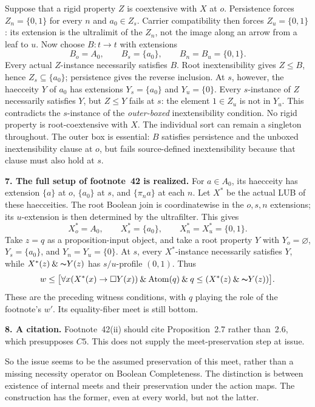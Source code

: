 \documentclass[12pt,leqno]{article}
\newcommand{\AND}{\ensuremath{\mathbin{\&}}}
\newcommand{\IC}{\ensuremath{\rightarrow}}
\newcommand{\NOT}{\ensuremath{\text{$\thicksim$}}}
\newcommand{\two}{\{0,1\}}
\newcommand{\Atom}{\operatorname{Atom}}
\begin{document}
Suppose that a rigid property $Z$ is coextensive with $X$ at $o$.
Persistence forces $Z_n=\two$ for every $n$ and $a_0\in Z_s$.
Carrier compatibility then forces $Z_u=\two$: its extension is the
ultralimit of the $Z_n$, not the image along an arrow from a leaf to $u$.
Now choose $B:t\to t$ with extensions
\[
 B_o=A_0,\qquad B_s=\{a_0\},\qquad B_n=B_u=\two.
\]
Every actual $Z$-instance necessarily satisfies $B$. Root
inextensibility gives $Z\leq B$, hence $Z_s\subseteq\{a_0\}$;
persistence gives the reverse inclusion.
At $s$, however, the haecceity $Y$ of $a_0$ has extensions
$Y_s=\{a_0\}$ and $Y_u=\{0\}$.
Every $s$-instance of $Z$ necessarily satisfies $Y$, but $Z\leq Y$
fails at $s$: the element $1\in Z_u$ is not in $Y_u$.
This contradicts the $s$-instance of the \emph{outer-boxed}
inextensibility condition. No rigid property is root-coextensive with
$X$. The individual sort can remain a singleton throughout.
The outer box is essential: $B$ satisfies persistence and the unboxed
inextensibility clause at $o$, but fails source-defined inextensibility
because that clause must also hold at $s$.

\medskip
\noindent\textbf{7. The full setup of footnote~42 is realized.}
For $a\in A_0$, its haecceity has extension $\{a\}$ at $o$,
$\{a_0\}$ at $s$, and $\{\pi_n a\}$ at each $n$.
Let $X^*$ be the actual LUB of these haecceities.
The root Boolean join is coordinatewise in the $o,s,n$ extensions;
its $u$-extension is then determined by the ultrafilter. This gives
\[
 X^*_o=A_0,\qquad X^*_s=\{a_0\},\qquad X^*_n=X^*_u=\two.
\]
Take $z=q$ as a proposition-input object, and take a root property $Y$
with $Y_o=\varnothing$, $Y_s=\{a_0\}$, and $Y_n=Y_u=\{0\}$.
At $s$, every $X^*$-instance necessarily satisfies $Y$, while
$X^*(z)\AND\NOT Y(z)$ has $s/u$-profile $(0,1)$. Thus
\[
 w\leq\bigl[\forall x(X^*(x)\IC\Box Y(x))\AND\Atom(q)
        \AND q\leq(X^*(z)\AND\NOT Y(z))\bigr].
\]
These are the preceding witness conditions, with $q$ playing the role
of the footnote's $w'$. Its equality-fiber meet is still bottom.

\medskip
\noindent\textbf{8. A citation.}
Footnote~42(ii) should cite Proposition~2.7 rather than~2.6,
which presupposes $C5$. This does not supply the meet-preservation
step at issue.

\medskip
So the issue seems to be the assumed preservation of this meet, rather
than a missing necessity operator on Boolean Completeness. The distinction is between existence of internal meets and their
preservation under the action maps. The construction has the former,
even at every world, but not the latter.
\end{document}
